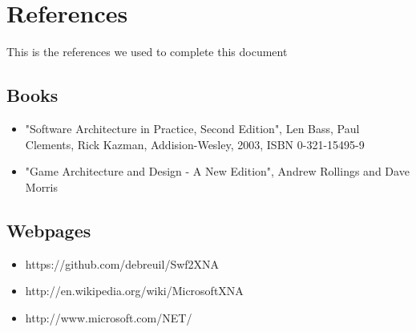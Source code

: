 \chapter{References}
This is the references we used to complete this document
\section{Books}
\begin{itemize}
\item "Software Architecture in Practice, Second Edition", Len Bass, Paul Clements, Rick Kazman, Addision-Wesley, 2003, ISBN 0-321-15495-9
\item "Game Architecture and Design - A New Edition", Andrew Rollings and Dave Morris
\end{itemize}
\section{Webpages}
\begin{itemize}
\item https://github.com/debreuil/Swf2XNA
\item http://en.wikipedia.org/wiki/MicrosoftXNA
\item http://www.microsoft.com/NET/

\end{itemize}
